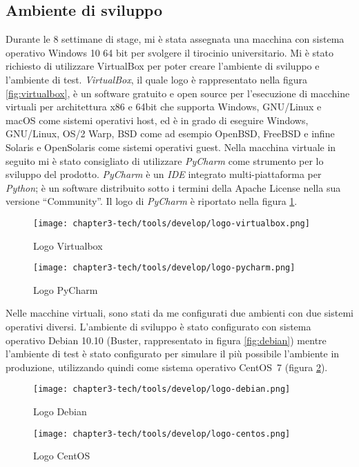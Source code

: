 \subsection{Ambiente di sviluppo} \label{subsec: sviluppo}
Durante le 8 settimane di stage, mi è stata assegnata una macchina con sistema operativo Windows 10 64 bit per svolgere il tirocinio universitario. Mi è stato richiesto di utilizzare VirtualBox per poter creare l’ambiente di sviluppo e l’ambiente di test. \emph{VirtualBox}, il quale logo è rappresentato nella figura \ref{fig:virtualbox}, è un software gratuito e open source per l’esecuzione di macchine virtuali per architettura x86 e 64bit che supporta Windows, GNU/Linux e macOS come sistemi operativi host, ed è in grado di eseguire Windows, GNU/Linux, OS/2 Warp, BSD come ad esempio OpenBSD, FreeBSD e infine Solaris e OpenSolaris come sistemi operativi guest.\newline{}
Nella macchina virtuale in seguito mi è stato consigliato di utilizzare \emph{PyCharm} come strumento per lo sviluppo del prodotto. \emph{PyCharm} è un \emph{IDE} integrato multi-piattaforma per \emph{Python}; è un software distribuito sotto i termini della Apache License nella sua versione ``Community''. Il logo di \emph{PyCharm} è riportato nella figura \ref{fig:pycharm}.
\begin{figure}[!h]
    \begin{minipage}{.5\textwidth} 
        \centering 
        \texttt{[image: chapter3-tech/tools/develop/logo-virtualbox.png]} 
        \caption{Logo Virtualbox} 
        \label{fig:virtualbox} 
    \end{minipage}%
    \begin{minipage}{.5\textwidth} 
        \centering 
        \texttt{[image: chapter3-tech/tools/develop/logo-pycharm.png]} 
        \caption{Logo PyCharm} 
        \label{fig:pycharm} 
    \end{minipage}  
\end{figure}

\noindent
Nelle macchine virtuali, sono stati da me configurati due ambienti con due sistemi operativi diversi. L’ambiente di sviluppo è stato configurato con sistema operativo Debian 10.10 (Buster, rappresentato in figura \ref{fig:debian}) mentre l’ambiente di test è stato configurato per simulare il più possibile l’ambiente in produzione, utilizzando quindi come sistema operativo CentOS~7 (figura \ref{fig:centos}).
\begin{figure}[!h]
    \begin{minipage}{.5\textwidth} 
        \centering 
        \texttt{[image: chapter3-tech/tools/develop/logo-debian.png]} 
        \caption{Logo Debian} 
        \label{fig:debian} 
    \end{minipage}%
    \begin{minipage}{.5\textwidth} 
        \centering 
        \texttt{[image: chapter3-tech/tools/develop/logo-centos.png]} 
        \caption{Logo CentOS} 
        \label{fig:centos} 
    \end{minipage}  
\end{figure}
